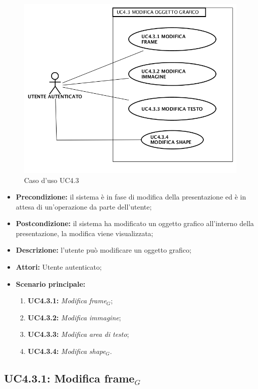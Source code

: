 \begin{figure}[h]
	\begin{center}
	\includegraphics[scale=0.4]{diagram/UC4-3.png}
	\caption{Caso d'uso UC4.3}
	\end{center}
\end{figure}
\begin{itemize}
	\item \textbf{Precondizione:} il sistema è in fase di modifica della presentazione ed è in attesa di un'operazione da parte dell'utente;
	\item \textbf{Postcondizione:} il sistema ha modificato un oggetto grafico all'interno della presentazione, la modifica viene visualizzata;
	\item \textbf{Descrizione:} l'utente può modificare un oggetto grafico;
	\item \textbf{Attori:} Utente autenticato;
	\item \textbf{Scenario principale:}
	\begin{enumerate}
		\item \textbf{ UC4.3.1:} \textit{ Modifica frame$_G$};
		\item \textbf{ UC4.3.2:} \textit{ Modifica immagine};
		\item \textbf{ UC4.3.3:} \textit{ Modifica area di testo};
		\item \textbf{ UC4.3.4:} \textit{ Modifica shape$_G$}.
	\end{enumerate}
\end{itemize}
\subsection{ UC4.3.1: Modifica frame$_G$}

